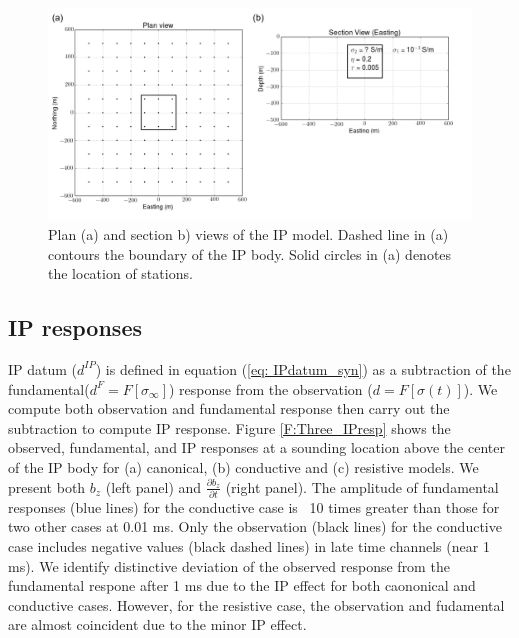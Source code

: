 \documentclass[a4paper, 11pt]{article}
\newcommand{\siginf}{\sigma_\infty}
\newcommand{\dip}{d^{IP}}
\begin{document}
\begin{figure}[htb]
  \centering
  \includegraphics[width=1.0\textwidth]{figures/IPModel.png}
  \caption{Plan (a) and section b) views of the IP model. Dashed line in (a) contours the boundary of the IP body. Solid circles in (a) denotes the location of stations.}
  \label{F: IPModel}
\end{figure}
\clearpage

\subsection{IP responses}
IP datum ($\dip$) is defined in equation (\ref{eq: IPdatum_syn}) as a subtraction of the fundamental($d^{F}=F[\siginf]$) response from the observation ($d=F[\sigma(t)]$). 
We compute both observation and fundamental response then carry out the subtraction to compute IP response. 
Figure \ref{F:Three_IPresp} shows the observed, fundamental, and IP responses at a sounding location above the center of the IP body for (a) canonical, (b) conductive and (c) resistive models.
We present both $b_z$ (left panel) and $\frac{\partial b_z}{\partial t}$ (right panel).
The amplitude of fundamental responses (blue lines) for the conductive case is ~10 times greater than those for two other cases at 0.01 ms. 
Only the observation (black lines) for the conductive case includes negative values (black dashed lines) in late time channels (near 1 ms). 
We identify distinctive deviation of the observed response from the fundamental respone after 1 ms due to the IP effect for both caononical and conductive cases.
However, for the resistive case, the observation and fudamental are almost coincident due to the minor IP effect. 
\end{document}
